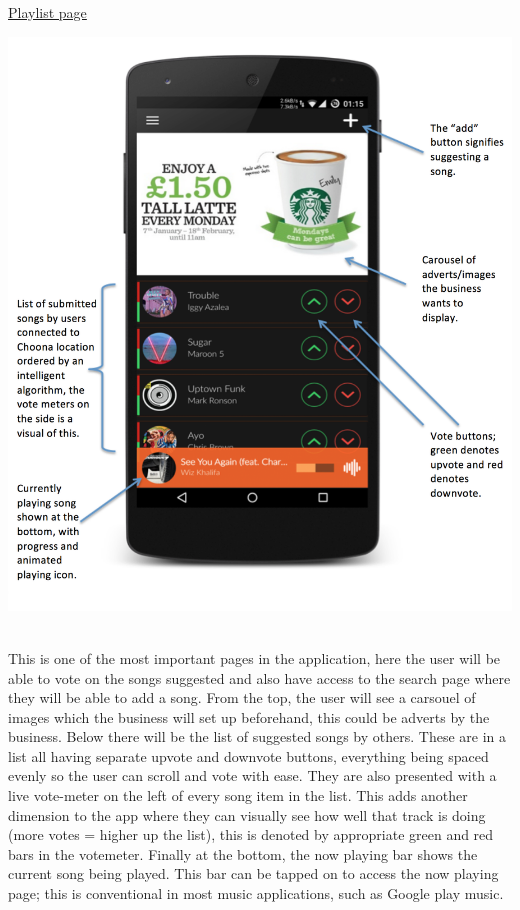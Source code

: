 \newpage

\noindent\underline{Playlist page}\newline

\noindent
\begin{minipage}{\linewidth}
\centering
\includegraphics[scale=0.47]{./img/playlistannotated.png}
\label{fig:playlist}
\end{minipage}\\

This is one of the most important pages in the application, here the user will be able to vote on the songs suggested and also have access to the search page where they will be able to add a song. From the top, the user will see a carsouel of images which the business will set up beforehand, this could be adverts by the business. Below there will be the list of suggested songs by others. These are in a list all having separate upvote and downvote buttons, everything being spaced evenly so the user can scroll and vote with ease. They are also presented with a live vote-meter on the left of every song item in the list. This adds another dimension to the app where they can visually see how well that track is doing (more votes = higher up the list), this is denoted by appropriate green and red bars in the votemeter. Finally at the bottom, the now playing bar shows the current song being played. This bar can be tapped on to access the now playing page; this is conventional in most music applications, such as Google play music.

